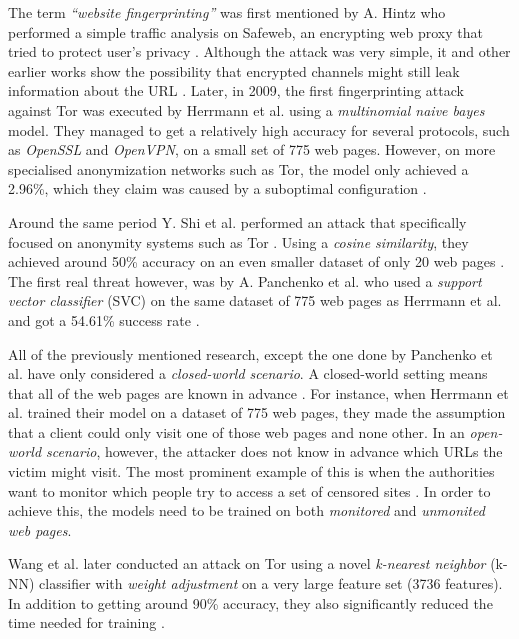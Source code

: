 The term \textit{``website fingerprinting''} was first mentioned by A. Hintz who performed a simple traffic analysis on Safeweb,
an encrypting web proxy that tried to protect user's privacy \cite{hintz2002fingerprinting}. Although the attack was very simple, it and other earlier
works show the possibility that encrypted channels might still leak information about the URL \cite{hintz2002fingerprinting, wagner1996analysis}.
Later, in 2009, the first fingerprinting attack against Tor was executed by Herrmann et al. using a \textit{multinomial naive bayes} model.
They managed to get a relatively high accuracy for several protocols, such as \textit{OpenSSL} and \textit{OpenVPN}, on a small set of 775 web pages.
However, on more specialised anonymization networks such as Tor, the model only achieved a 2.96\%, which they claim was caused by a suboptimal configuration \cite{herrmann2009website}.

Around the same period Y. Shi et al. performed an attack that specifically focused on anonymity systems such as Tor \cite{shi2009fingerprinting}.
Using a \textit{cosine similarity}, they achieved around 50\% accuracy on an even smaller dataset of only 20 web pages \cite{shi2009fingerprinting}.
The first real threat however, was by A. Panchenko et al. who used a \textit{support vector classifier} (SVC) on the same dataset of 775 web pages as Herrmann et al.
and got a 54.61\% success rate \cite{herrmann2009website, panchenko1}.

All of the previously mentioned research, except the one done by Panchenko et al. have only considered a \textit{closed-world scenario}.
A closed-world setting means that all of the web pages are known in advance \cite{panchenko1}.
For instance, when Herrmann et al. trained their model on a dataset of 775 web pages, they made the assumption that a client could only visit one of
those web pages and none other.
In an \textit{open-world scenario}, however, the attacker does not know in advance which URLs the victim might visit.
The most prominent example of this is when the authorities want to monitor which people try to access a set of censored sites \cite{panchenko1}.
In order to achieve this, the models need to be trained on both \textit{monitored} and \textit{unmonited web pages}.

Wang et al. later conducted an attack on Tor using a novel \textit{k-nearest neighbor} (k-NN) classifier with \textit{weight adjustment} on a very large feature set (3736 features).
In addition to getting around 90\% accuracy, they also significantly reduced the time needed for training \cite{wang_cai_johnson_nithyanand_goldberg_2014}.


